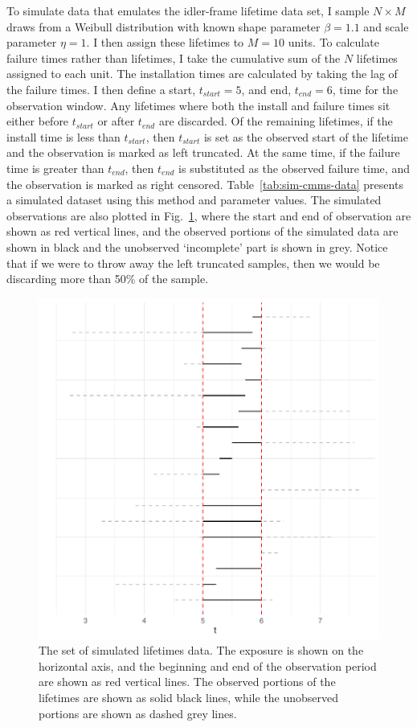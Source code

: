 To simulate data that emulates the idler-frame lifetime data set, I sample $N \times M$ draws from a Weibull distribution with known shape parameter $\beta = 1.1$ and scale parameter $\eta = 1$. I then assign these lifetimes to $M = 10$ units. To calculate failure times rather than lifetimes, I take the cumulative sum of the $N$ lifetimes assigned to each unit. The installation times are calculated by taking the lag of the failure times. I then define a start, $t_{start} = 5$, and end, $t_{end} = 6$, time for the observation window. Any lifetimes where both the install and failure times sit either before $t_{start}$ or after $t_{end}$ are discarded. Of the remaining lifetimes, if the install time is less than $t_{start}$, then $t_{start}$ is set as the observed start of the lifetime and the observation is marked as left truncated. At the same time, if the failure time is greater than $t_{end}$, then $t_{end}$ is substituted as the observed failure time, and the observation is marked as right censored. Table~\ref{tab:sim-cmms-data} presents a simulated dataset using this method and parameter values. The simulated observations are also plotted in Fig.~\ref{fig:sim_censored_units}, where the start and end of observation are shown as red vertical lines, and the observed portions of the simulated data are shown in black and the unobserved `incomplete' part is shown in grey. Notice that if we were to throw away the left truncated samples, then we would be discarding more than 50\% of the sample.

\begin{figure}
    \centering
    \includegraphics[width=1\textwidth]{./figures/ch-2/sim-data.pdf}
    \caption{The set of simulated lifetimes data. The exposure is shown on the horizontal axis, and the beginning and end of the observation period are shown as red vertical lines. The observed portions of the lifetimes are shown as solid black lines, while the unobserved portions are shown as dashed grey lines.}
    \label{fig:sim_censored_units}
\end{figure}

